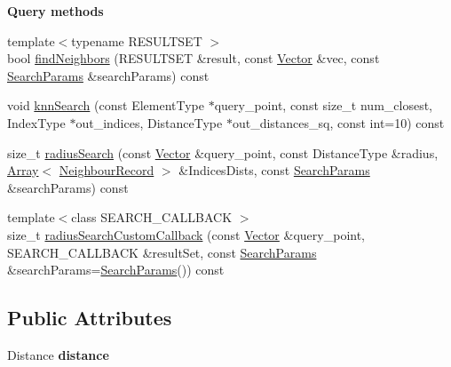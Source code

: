 \begin{Indent}{\bf Query methods}\par
\begin{DoxyCompactItemize}
\item 
{\footnotesize template$<$typename R\+E\+S\+U\+L\+T\+S\+ET $>$ }\\bool \hyperlink{classSph_1_1KDTreeSingleIndexAdaptor_a444955d9248884e7fcb1fb238c3b0105}{find\+Neighbors} (R\+E\+S\+U\+L\+T\+S\+ET \&result, const \hyperlink{classBasicVector}{Vector} \&vec, const \hyperlink{structSph_1_1SearchParams}{Search\+Params} \&search\+Params) const
\item 
void \hyperlink{classSph_1_1KDTreeSingleIndexAdaptor_ab2712a5eafbf9344143d2eadff15e802}{knn\+Search} (const Element\+Type $\ast$query\+\_\+point, const size\+\_\+t num\+\_\+closest, Index\+Type $\ast$out\+\_\+indices, Distance\+Type $\ast$out\+\_\+distances\+\_\+sq, const int=10) const
\item 
size\+\_\+t \hyperlink{classSph_1_1KDTreeSingleIndexAdaptor_a1b00ad9bd5a4e2e265011ad4d2265e03}{radius\+Search} (const \hyperlink{classBasicVector}{Vector} \&query\+\_\+point, const Distance\+Type \&radius, \hyperlink{classArray}{Array}$<$ \hyperlink{structNeighbourRecord}{Neighbour\+Record} $>$ \&Indices\+Dists, const \hyperlink{structSph_1_1SearchParams}{Search\+Params} \&search\+Params) const
\item 
{\footnotesize template$<$class S\+E\+A\+R\+C\+H\+\_\+\+C\+A\+L\+L\+B\+A\+CK $>$ }\\size\+\_\+t \hyperlink{classSph_1_1KDTreeSingleIndexAdaptor_a536e60a78161542b81631f661635e7c5}{radius\+Search\+Custom\+Callback} (const \hyperlink{classBasicVector}{Vector} \&query\+\_\+point, S\+E\+A\+R\+C\+H\+\_\+\+C\+A\+L\+L\+B\+A\+CK \&result\+Set, const \hyperlink{structSph_1_1SearchParams}{Search\+Params} \&search\+Params=\hyperlink{structSph_1_1SearchParams}{Search\+Params}()) const
\end{DoxyCompactItemize}
\end{Indent}
\subsection*{Public Attributes}
\begin{DoxyCompactItemize}
\item 
\hypertarget{classSph_1_1KDTreeSingleIndexAdaptor_a5bfc663e833429c4f8c3761c50112139}{}\label{classSph_1_1KDTreeSingleIndexAdaptor_a5bfc663e833429c4f8c3761c50112139} 
Distance {\bfseries distance}
\end{DoxyCompactItemize}
